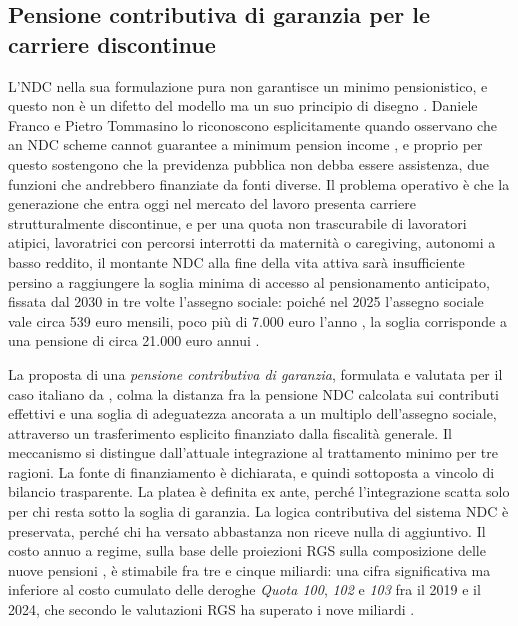 \subsection{Pensione contributiva di garanzia per le carriere discontinue}
\label{sub:pcg}

\noindent
L'NDC nella sua formulazione pura non garantisce un minimo pensionistico, e
questo non è un difetto del modello ma un suo principio di disegno
\cite{FrancoTommasino2020}. Daniele Franco e Pietro Tommasino lo riconoscono
esplicitamente quando osservano che \guillemotleft{}an NDC scheme cannot guarantee a
minimum pension income \guillemotright{}\cite{FrancoTommasino2020}, e proprio per questo
sostengono che la previdenza pubblica non debba essere assistenza, due
funzioni che andrebbero finanziate da fonti diverse. Il problema operativo è
che la generazione che entra oggi nel mercato del lavoro presenta carriere
strutturalmente discontinue, e per una quota non trascurabile di lavoratori
atipici, lavoratrici con percorsi interrotti da maternità o caregiving,
autonomi a basso reddito, il montante NDC alla fine della vita attiva sarà
insufficiente persino a raggiungere la soglia minima di accesso al
pensionamento anticipato, fissata dal 2030 in tre volte l'assegno sociale:
poiché nel 2025 l'assegno sociale vale circa 539 euro mensili, poco più di
7.000 euro l'anno \cite{INPSAssegnoSociale2025}, la soglia corrisponde a una
pensione di circa 21.000 euro annui \cite{MEF_RGS2025_NdA}.

\medskip
\noindent
La proposta di una \emph{pensione contributiva di garanzia}, formulata e
valutata per il caso italiano da \citet{Raitano2020}, colma la
distanza fra la pensione NDC calcolata sui contributi effettivi e una soglia di
adeguatezza ancorata a un multiplo dell'assegno sociale, attraverso un
trasferimento esplicito finanziato dalla fiscalità generale. Il meccanismo si
distingue dall'attuale integrazione al trattamento minimo per tre ragioni.
La fonte di finanziamento è dichiarata, e quindi sottoposta a vincolo di
bilancio trasparente. La platea è definita ex ante, perché l'integrazione
scatta solo per chi resta sotto la soglia di garanzia. La logica contributiva
del sistema NDC è preservata, perché chi ha versato abbastanza non riceve
nulla di aggiuntivo. Il costo annuo a regime, sulla base delle proiezioni RGS
sulla composizione delle nuove pensioni \cite{MEF_RGS2025}, è stimabile fra
tre e cinque miliardi: una cifra significativa ma inferiore al costo cumulato
delle deroghe \emph{Quota 100}, \emph{102} e \emph{103} fra il 2019 e il 2024,
che secondo le valutazioni RGS ha superato i nove miliardi
\cite{MEF_RGS2025_NdA, BosiGuerra2022}.

